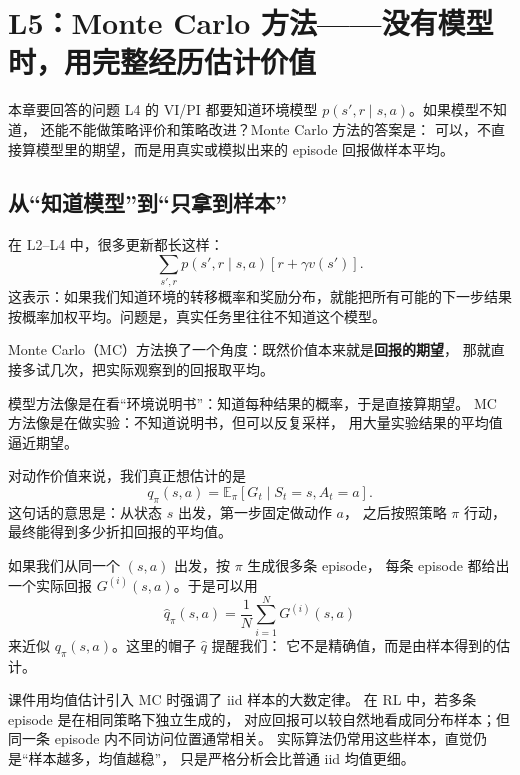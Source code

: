 \documentclass[11pt,a4paper,fontset=fandol]{ctexart}
\newcommand{\E}{\mathbb{E}}
\newcommand{\qpi}{q_{\pi}}
\begin{document}
\clearpage
\section{L5：Monte Carlo 方法——没有模型时，用完整经历估计价值}

\begin{goalbox}{本章要回答的问题}
L4 的 VI/PI 都要知道环境模型 \(p(s',r\mid s,a)\)。如果模型不知道，
还能不能做策略评价和策略改进？Monte Carlo 方法的答案是：
可以，不直接算模型里的期望，而是用真实或模拟出来的 episode 回报做样本平均。
\end{goalbox}

\subsection{从“知道模型”到“只拿到样本”}

在 L2--L4 中，很多更新都长这样：
\[
\sum_{s',r}p(s',r\mid s,a)\left[r+\gamma v(s')\right].
\]
这表示：如果我们知道环境的转移概率和奖励分布，就能把所有可能的下一步结果
按概率加权平均。问题是，真实任务里往往不知道这个模型。

Monte Carlo（MC）方法换了一个角度：既然价值本来就是\textbf{回报的期望}，
那就直接多试几次，把实际观察到的回报取平均。

\begin{intuitionbox}
模型方法像是在看“环境说明书”：知道每种结果的概率，于是直接算期望。
MC 方法像是在做实验：不知道说明书，但可以反复采样，
用大量实验结果的平均值逼近期望。
\end{intuitionbox}

对动作价值来说，我们真正想估计的是
\[
\qpi(s,a)=\E_{\pi}[G_t\mid S_t=s,A_t=a].
\]
这句话的意思是：从状态 \(s\) 出发，第一步固定做动作 \(a\)，
之后按照策略 \(\pi\) 行动，最终能得到多少折扣回报的平均值。

如果我们从同一个 \((s,a)\) 出发，按 \(\pi\) 生成很多条 episode，
每条 episode 都给出一个实际回报 \(G^{(i)}(s,a)\)。于是可以用
\[
\boxed{
\hat q_{\pi}(s,a)
=
\frac{1}{N}\sum_{i=1}^{N}G^{(i)}(s,a)
}
\]
来近似 \(\qpi(s,a)\)。这里的帽子 \(\hat q\) 提醒我们：
它不是精确值，而是由样本得到的估计。

\begin{warningbox}
课件用均值估计引入 MC 时强调了 iid 样本的大数定律。
在 RL 中，若多条 episode 是在相同策略下独立生成的，
对应回报可以较自然地看成同分布样本；但同一条 episode 内不同访问位置通常相关。
实际算法仍常用这些样本，直觉仍是“样本越多，均值越稳”，
只是严格分析会比普通 iid 均值更细。
\end{warningbox}
\end{document}
